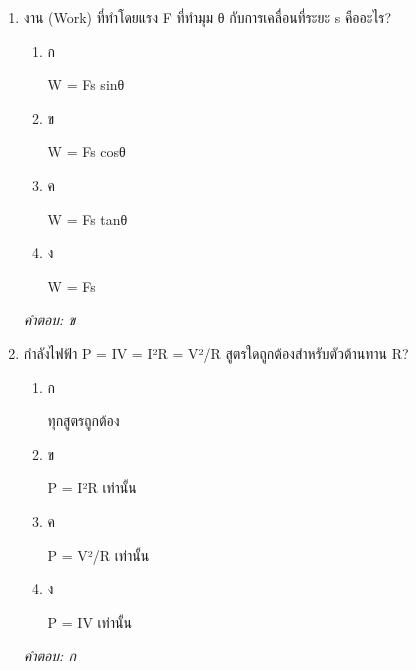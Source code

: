 \documentclass[12pt]{article}
\begin{document}
\begin{enumerate}[label=\arabic*., itemsep=0.5\baselineskip, topsep=0.5\baselineskip, leftmargin=*]
\item งาน (Work) ที่ทำโดยแรง F ที่ทำมุม θ กับการเคลื่อนที่ระยะ s คืออะไร?
\begin{enumerate}[label=\alph*)., itemsep=0.3\baselineskip, topsep=0.3\baselineskip]
\item ก\ 
\begin{minipage}[t]{0.9\linewidth}
\raggedright W = Fs sinθ
\end{minipage}
\item ข\ 
\begin{minipage}[t]{0.9\linewidth}
\raggedright W = Fs cosθ
\end{minipage}
\item ค\ 
\begin{minipage}[t]{0.9\linewidth}
\raggedright W = Fs tanθ
\end{minipage}
\item ง\ 
\begin{minipage}[t]{0.9\linewidth}
\raggedright W = Fs
\end{minipage}
\end{enumerate}
\vspace{-0.3\baselineskip}
\begin{small}
\textit{คำตอบ: ข}
\end{small}

\item กำลังไฟฟ้า P = IV = I²R = V²/R สูตรใดถูกต้องสำหรับตัวต้านทาน R?
\begin{enumerate}[label=\alph*)., itemsep=0.3\baselineskip, topsep=0.3\baselineskip]
\item ก\ 
\begin{minipage}[t]{0.9\linewidth}
\raggedright ทุกสูตรถูกต้อง
\end{minipage}
\item ข\ 
\begin{minipage}[t]{0.9\linewidth}
\raggedright P = I²R เท่านั้น
\end{minipage}
\item ค\ 
\begin{minipage}[t]{0.9\linewidth}
\raggedright P = V²/R เท่านั้น
\end{minipage}
\item ง\ 
\begin{minipage}[t]{0.9\linewidth}
\raggedright P = IV เท่านั้น
\end{minipage}
\end{enumerate}
\vspace{-0.3\baselineskip}
\begin{small}
\textit{คำตอบ: ก}
\end{small}


\end{enumerate}
\end{document}
